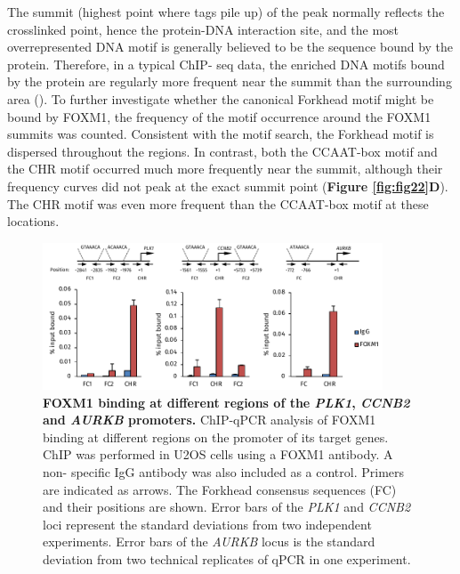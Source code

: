 The summit (highest point where tags pile up) of the peak normally reflects the crosslinked point, hence the protein-DNA interaction site, and the most overrepresented DNA motif is generally believed to be the sequence bound by the protein. Therefore, in a typical ChIP- seq data, the enriched DNA motifs bound by the protein are regularly more frequent near the summit than the surrounding area (\cite{zhang2008model-based}). To further investigate whether the canonical Forkhead motif might be bound by FOXM1, the frequency of the motif occurrence around the FOXM1 summits was counted. Consistent with the motif search, the Forkhead motif is dispersed throughout the regions. In contrast, both the CCAAT-box motif and the CHR motif occurred much more frequently near the summit, although their frequency curves did not peak at the exact summit point (\textbf{Figure \ref{fig:fig22}D}). The CHR motif was even more frequent than the CCAAT-box motif at these locations.

\begin{figure}[!h]
    \centering
    \includegraphics[width=0.9\textwidth]{chapter3/figures_foxm1/fig23.pdf}
    \caption[FOXM1 binding at different regions of the PLK1, CCNB2 and AURKB promoters]{\textbf{FOXM1 binding at different regions of the \textit{PLK1}, \textit{CCNB2} and \textit{AURKB} promoters.} ChIP-qPCR analysis of FOXM1 binding at different regions on the promoter of its target genes. ChIP was performed in U2OS cells using a FOXM1 antibody. A non- specific IgG antibody was also included as a control. Primers are indicated as arrows. The Forkhead consensus sequences (FC) and their positions are shown. Error bars of the \textit{PLK1} and \textit{CCNB2} loci represent the standard deviations from two independent experiments. Error bars of the \textit{AURKB} locus is the standard deviation from two technical replicates of qPCR in one experiment.}
    \label{fig:fig23}
\end{figure}

